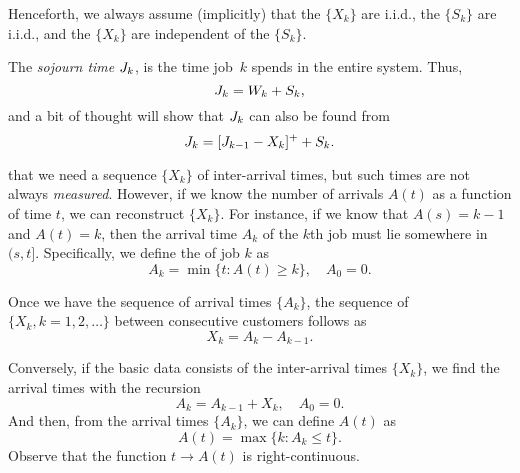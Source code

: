 Henceforth, we always assume (implicitly) that the $\{X_k\}$ are i.i.d., the $\{S_k\}$ are i.i.d., and the $\{X_k\}$ are independent of the $\{S_k\}$.


The \emph{sojourn time} $J_k$, is the time  job~$k$ spends in the entire system. Thus,
\begin{equation*}
 J_k = W_{k} + S_k,
\end{equation*}
and a bit of thought will show that $J_k$ can also be found from
\begin{equation}
\label{eq:59}
J_{k} = [J_{k-1} - X_k]^+ + S_k.
\end{equation}


 that we need a sequence $\{X_k\}$ of inter-arrival times, but such times are not always \emph{measured}.
However, if we know the number of arrivals $A(t)$ as a function of time $t$, we can reconstruct $\{X_k\}$.
For instance, if we know that $A(s) = k-1$ and $A(t) = k$, then the arrival time $A_k$ of the $k$th job must lie somewhere in $(s,t]$.
Specifically, we define the  of job $k$ as
\begin{equation*}
 A_k = \min\{t: A(t) \geq k\}, \quad A_0 = 0.
\end{equation*}


Once we have the sequence of arrival times $\{A_k\}$, the sequence of  $\{X_k, k=1, 2, \ldots\}$ between consecutive customers follows as
\begin{equation*}
 X_k = A_k - A_{k-1}.
\end{equation*}

Conversely, if the basic data consists of the inter-arrival times $\{X_k\}$, we find the arrival times with the recursion
\begin{equation}\label{eq:29}
 A_k = A_{k-1} + X_k, \quad A_0 = 0.
\end{equation}
And then, from the  arrival times $\{A_k\}$, we can define  $A(t)$ as 
\begin{equation} \label{eq:2}
 A(t) = \max\{k: A_k \leq t\}.
\end{equation}
Observe that the function $t\to A(t)$ is right-continuous.

